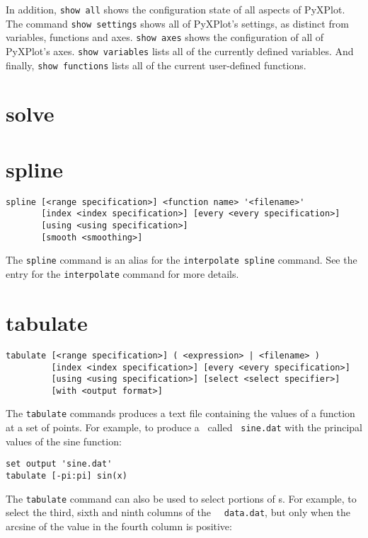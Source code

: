 In addition, {\tt show all} shows the configuration state of all aspects of
PyXPlot. The command {\tt show settings} shows all of PyXPlot's settings, as
distinct from variables, functions and axes. {\tt show axes} shows the
configuration of all of PyXPlot's axes. {\tt show variables} lists all of the
currently defined variables. And finally, {\tt show functions} lists all of the
current user-defined functions.


\section{solve}


\section{spline}

\begin{verbatim}
spline [<range specification>] <function name> '<filename>'
       [index <index specification>] [every <every specification>]
       [using <using specification>]
       [smooth <smoothing>]
\end{verbatim}

The {\tt spline} command is an alias for the {\tt interpolate spline} command.
See the entry for the {\tt interpolate} command for more details.


\section{tabulate}

\begin{verbatim}
tabulate [<range specification>] ( <expression> | <filename> )
         [index <index specification>] [every <every specification>]
         [using <using specification>] [select <select specifier>]
         [with <output format>]
\end{verbatim}

The {\tt tabulate} commands produces a text file containing the values of a
function at a set of points.  For example, to produce a \datafile\ called {\tt
sine.dat} with the principal values of the sine function:

\begin{verbatim}
set output 'sine.dat'
tabulate [-pi:pi] sin(x)
\end{verbatim}

The {\tt tabulate} command can also be used to select portions of \datafile s.
For example, to select the third, sixth and ninth columns of the \datafile\ {\tt
data.dat}, but only when the arcsine of the value in the fourth column is
positive:

